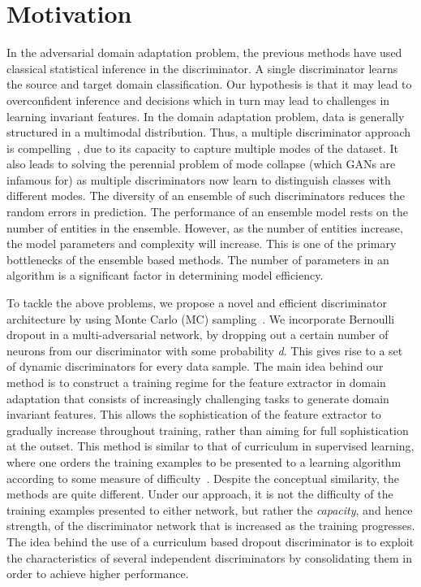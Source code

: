 \documentclass{bmvc2k}
\begin{document}
\section{Motivation}
In the adversarial domain adaptation problem, the previous methods have used classical statistical inference in the discriminator. A single discriminator learns the source and target domain classification. Our hypothesis is that it may lead to overconfident inference and decisions which in turn may lead to challenges in learning invariant features. In the domain adaptation problem, data is generally structured in a multimodal distribution. Thus, a multiple discriminator approach is compelling~\cite{pei_arxiv2018}, due to its capacity to capture multiple modes of the dataset. It also leads to solving the perennial problem of mode collapse (which GANs are infamous for) as multiple discriminators now learn to distinguish classes with different modes. The diversity of an ensemble of such discriminators reduces the random errors in prediction. The performance of an ensemble model rests on the number of entities in the ensemble. However, as the number of entities increase, the model parameters and complexity will increase. This is one of the primary bottlenecks of the ensemble based methods. The number of parameters in an algorithm is a significant factor in determining model efficiency.

To tackle the above problems, we propose a novel and efficient discriminator architecture by using Monte Carlo (MC) sampling~\cite{srivastava_jmlr2014dropout}. We incorporate Bernoulli dropout in a multi-adversarial network, by dropping out a certain number of neurons from our discriminator with some probability \textit{d}. This gives rise to a set of dynamic discriminators for every data sample. The main idea behind our method is to construct a training regime for the feature extractor in domain adaptation that consists of increasingly challenging tasks to generate domain invariant features. This allows the sophistication of the feature extractor to gradually increase throughout training, rather than aiming for full sophistication at the outset. This method is similar to that of curriculum in supervised learning, where one orders the training examples to be presented to a learning
algorithm according to some measure of difficulty~\cite{bengio2009curriculum}. Despite the conceptual similarity, the methods are quite different. Under our approach, it is not the difficulty of the training examples presented to either network, but rather the \textit{capacity}, and hence strength, of the discriminator network that is increased as the training progresses. The idea behind the use of a curriculum based dropout discriminator is to exploit the characteristics of several independent discriminators by consolidating them in order to achieve higher performance. 
\end{document}
